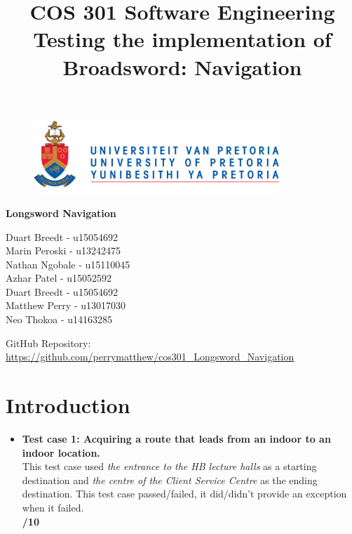 \documentclass{article}
\begin{document}
		\begin{figure}[t]
			\centering
			\includegraphics[width=350px]{UP_Logo.PNG}
		\end{figure}
			\title{COS 301 Software Engineering\\ Testing the implementation of Broadsword: Navigation}
\maketitle
		\begin{center}
			\textbf{\newline Longsword Navigation} \\
		\end{center}
			
				
		\begin{flushright} \large
			Duart Breedt - u15054692\\			
			Marin Peroski - u13242475\\
			Nathan Ngobale -  u15110045\\
			Azhar Patel - u15052592\\
			Duart Breedt - u15054692\\
			Matthew Perry - u13017030\\
			Neo Thokoa - u14163285\\
		\end{flushright}
		
		
		
		
		GitHub Repository: \href{https://github.com/perrymatthew/cos301_Longsword_Navigation}\\
		\url{https://github.com/perrymatthew/cos301_Longsword_Navigation}
	

\clearpage
\tableofcontents
\clearpage

\section{Introduction}
\begin{itemize}
\item \textbf{Test case 1: Acquiring a route that leads from an indoor to an indoor location.} \\
							This test case used \textit{the entrance to the HB lecture halls} as a starting destination and \textit{the centre of the Client Service Centre} as the ending destination.
							This test case passed/failed, it did/didn't provide an exception when it failed.
							\\ \textbf{/10}
							\end{itemize}
\clearpage
\end{document}
